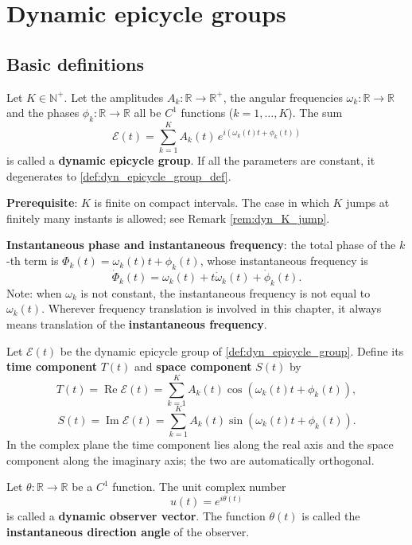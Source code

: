 \section{Dynamic epicycle groups}
\label{sec:dyn_single}

\subsection{Basic definitions}

\begin{definition}\label{def:dyn_epicycle_group}
Let $K\in\mathbb N^+$. Let the amplitudes $A_k:\mathbb R\to\mathbb R^+$, the angular frequencies $\omega_k:\mathbb R\to\mathbb R$ and the phases $\phi_k:\mathbb R\to\mathbb R$ all be $C^1$ functions ($k=1,\dots,K$). The sum
\[
\mathcal E(t)=\sum_{k=1}^{K}A_k(t)\,e^{i(\omega_k(t)t+\phi_k(t))}
\]
is called a \textbf{dynamic epicycle group}. If all the parameters are constant, it degenerates to \cref{def:dyn_epicycle_group_def}.

\textbf{Prerequisite}: $K$ is finite on compact intervals. The case in which $K$ jumps at finitely many instants is allowed; see Remark \ref{rem:dyn_K_jump}.

\textbf{Instantaneous phase and instantaneous frequency}: the total phase of the $k$-th term is $\Phi_k(t)=\omega_k(t)t+\phi_k(t)$, whose instantaneous frequency is
\[
\dot\Phi_k(t)=\omega_k(t)+t\dot\omega_k(t)+\dot\phi_k(t).
\]
Note: when $\omega_k$ is not constant, the instantaneous frequency is not equal to $\omega_k(t)$. Wherever frequency translation is involved in this chapter, it always means translation of the \textbf{instantaneous frequency}.
\end{definition}

\begin{definition}\label{def:dyn_time_space_components}
Let $\mathcal E(t)$ be the dynamic epicycle group of \cref{def:dyn_epicycle_group}. Define its \textbf{time component} $T(t)$ and \textbf{space component} $S(t)$ by
\[
T(t)=\operatorname{Re}\mathcal E(t)=\sum_{k=1}^{K}A_k(t)\cos(\omega_k(t)t+\phi_k(t)),
\]
\[
S(t)=\operatorname{Im}\mathcal E(t)=\sum_{k=1}^{K}A_k(t)\sin(\omega_k(t)t+\phi_k(t)).
\]
In the complex plane the time component lies along the real axis and the space component along the imaginary axis; the two are automatically orthogonal.
\end{definition}

\begin{definition}\label{def:dyn_observer}
Let $\theta:\mathbb R\to\mathbb R$ be a $C^1$ function. The unit complex number
\[
u(t)=e^{i\theta(t)}
\]
is called a \textbf{dynamic observer vector}. The function $\theta(t)$ is called the \textbf{instantaneous direction angle} of the observer.
\end{definition}

